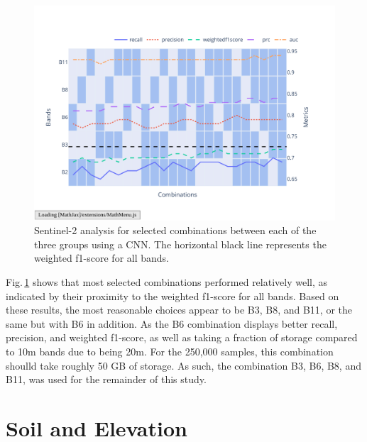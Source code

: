 \begin{figure}[ht]
    \centering
    \includegraphics[width=0.9\linewidth, trim={20pt 40pt 10pt 30pt}, clip]{figures/figures_analysis/band_selection_further.pdf}
    \caption{Sentinel-2 analysis for selected combinations between each of the three groups using a CNN. The horizontal black line represents the weighted f1-score for all bands.}
    \label{fig:band_selection_further}
\end{figure}

Fig.\,\ref{fig:band_selection_further} shows that most selected combinations performed relatively well, as indicated by their proximity to the weighted f1-score for all bands. Based on these results, the most reasonable choices appear to be B3, B8, and B11, or the same but with B6 in addition. As the B6 combination displays better recall, precision, and weighted f1-score, as well as taking a fraction of storage compared to 10m bands due to being 20m. For the 250,000 samples, this combination shoulld take roughly 50 GB of storage. As such, the combination B3, B6, B8, and B11, was used for the remainder of this study.

\section{Soil and Elevation}

